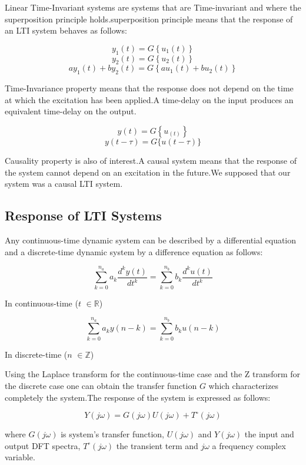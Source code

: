 \documentclass[a4paper,12pt]{article}
\numberwithin{equation}{section}
\begin{document}
Linear Time-Invariant systems are systems that are Time-invariant and where the superposition principle holds.superposition principle means that the response of an LTI system behaves as follows:
    
\[y_{1}(t)=G\left\{u_{1}(t)\right\} \]
\[y_{2}(t)=G\left\{u_{2}(t)\right\} \]
\[a y_{1}(t)+b y_{2}(t)=G\left\{a u_{1}(t)+b u_{2}(t)\right\}\]

Time-Invariance property means that the response does not depend on the time at which the excitation has been applied.A time-delay on the input produces an equivalent
time-delay on the output.

\[y(t)=G\left\{u_(t)\right\} \]
\[y(t-\tau)=G\{u(t-\tau)\}\]

Causality property is also of interest.A causal system means that the response of the system cannot depend on an excitation in the future.We supposed that our system was a causal LTI system. 

\subsection{Response of LTI Systems}
Any  continuous-time dynamic system can be described by a differential equation and a discrete-time dynamic system by a difference equation as follows:



\[\sum_{k=0}^{n_{a}} a_{k} \frac{d^{k} y(t)}{d t^{k}}=\sum_{k=0}^{n_{b}} b_{k} \frac{d^{k} u(t)}{d t^{k}} \]

In continuous-time ($t$ $\in \mathbb{R}$)

\[\sum_{k=0}^{n_{a}} a_{k} y(n-k)=\sum_{k=0}^{n_{b}} b_{k} u(n-k)\]

In discrete-time  ($n$ $\in \mathbb{Z}$)


Using the Laplace transform for the continuous-time case and the Z transform for the discrete case one can obtain the transfer function $G$ which characterizes completely the system.The response of the system is expressed as follows:

\begin{equation}\label{eq:sys.response}
Y(j\omega)=G\left(j\omega\right) U(j \omega)+T^{\circ}(j\omega)
\end{equation}

where $G\left(j\omega\right)$ is system's transfer function, $U(j \omega)$ and $Y(j\omega)$ the input and output DFT spectra, $T^{\circ}(j\omega)$ the transient term and $j \omega$ a frequency complex variable.
\end{document}

